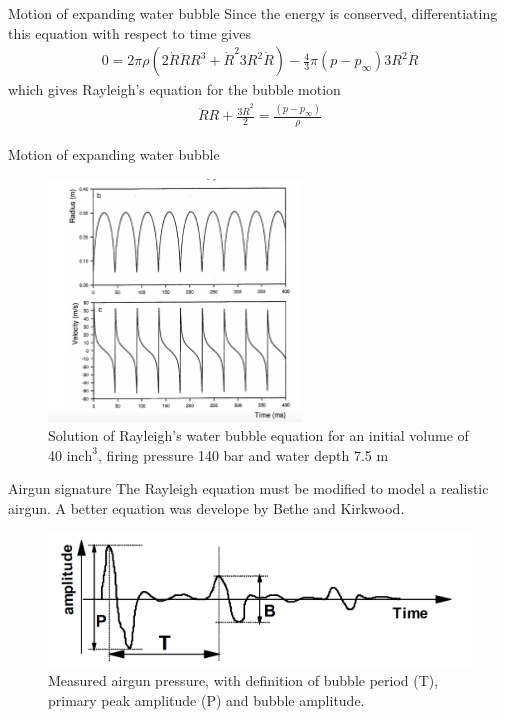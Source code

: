 \documentclass[xcolor=dvipsnames,notes]{beamer}
\begin{document}
\begin{frame}{Motion of expanding water bubble}
Since the energy is conserved, differentiating this equation 
with respect to time gives
\begin{eqnarray}
0 = 2\pi\rho \left(2\dot{R}\ddot{R}R^3 + \dot{R}^2 3R^2\dot{R}\right)
    -\frac{4}{3}\pi (p-p_{\infty}) 3R^2\dot{R} 
\end{eqnarray}
which gives Rayleigh's equation for the bubble motion
\begin{eqnarray}
  \ddot{R} R + \frac{3\dot{R}^2}{2} = \frac{(p-p_{\infty})}{\rho}
\end{eqnarray}
\end{frame}
\begin{frame}{Motion of expanding water bubble}
\begin{figure}
  \includegraphics[width=0.6\textwidth]{Fig/rayleigh.png}
  \caption{Solution of Rayleigh's water bubble equation for
           an initial volume of 40 $\mbox{inch}^3$, firing pressure 140 bar and
            water depth 7.5 m}
  \label{fig:rayleigh}
\end{figure}
\end{frame}
\begin{frame}{Airgun signature}
The Rayleigh equation must be modified to 
model a realistic airgun. A better equation was develope by
Bethe and Kirkwood.
\begin{figure}
  \includegraphics[width=\textwidth]{Fig/source.png}
  \caption{Measured airgun pressure, with definition
           of bubble period (T), primary peak amplitude (P)
           and bubble amplitude.}
  \label{fig:rayleigh2}
\end{figure}
\end{frame}
\end{document}
